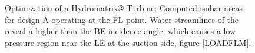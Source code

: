 \begin{figure}[h!]
\begin{minipage}[b]{1\linewidth}
 \centering
\end{minipage}
\caption{Optimization of a Hydromatrix$\circledR$ Turbine: Computed isobar areas for design A operating at the FL point. Water streamlines of the  reveal a higher than the BE incidence angle, which causes a low pressure region near the LE at the suction side, figure \ref{LOADFLM}. }
\label{design-FL-M}
\end{figure}


